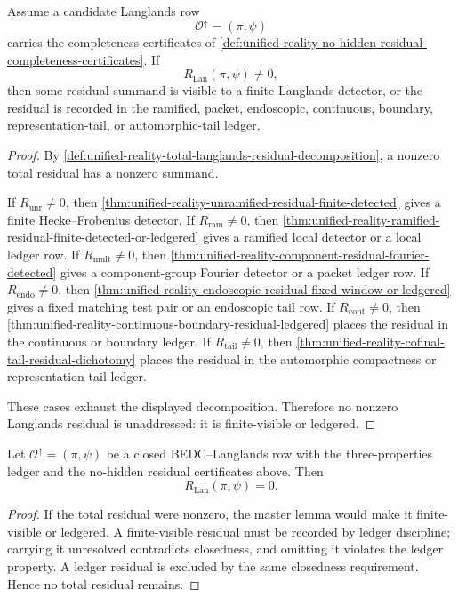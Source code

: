 \begin{theorem}
\label{thm:unified-reality-no-hidden-langlands-residual-master-lemma}
Assume a candidate Langlands row
$$
\mathcal O^\uparrow=(\pi,\psi)
$$
carries the completeness certificates of
\autoref{def:unified-reality-no-hidden-residual-completeness-certificates}.
If
$$
R_{\mathrm{Lan}}(\pi,\psi)\ne0,
$$
then some residual summand is visible to a finite Langlands detector, or
the residual is recorded in the ramified, packet, endoscopic,
continuous, boundary, representation-tail, or automorphic-tail ledger.
\end{theorem}
\begin{proof}
By
\autoref{def:unified-reality-total-langlands-residual-decomposition},
a nonzero total residual has a nonzero summand.

If $R_{\mathrm{unr}}\ne0$, then
\autoref{thm:unified-reality-unramified-residual-finite-detected}
gives a finite Hecke--Frobenius detector. If
$R_{\mathrm{ram}}\ne0$, then
\autoref{thm:unified-reality-ramified-residual-finite-detected-or-ledgered}
gives a ramified local detector or a local ledger row. If
$R_{\mathrm{mult}}\ne0$, then
\autoref{thm:unified-reality-component-residual-fourier-detected}
gives a component-group Fourier detector or a packet ledger row. If
$R_{\mathrm{endo}}\ne0$, then
\autoref{thm:unified-reality-endoscopic-residual-fixed-window-or-ledgered}
gives a fixed matching test pair or an endoscopic tail row. If
$R_{\mathrm{cont}}\ne0$, then
\autoref{thm:unified-reality-continuous-boundary-residual-ledgered}
places the residual in the continuous or boundary ledger. If
$R_{\mathrm{tail}}\ne0$, then
\autoref{thm:unified-reality-cofinal-tail-residual-dichotomy}
places the residual in the automorphic compactness or representation
tail ledger.

These cases exhaust the displayed decomposition. Therefore no nonzero
Langlands residual is unaddressed: it is finite-visible or ledgered.
\end{proof}

\begin{corollary}
\label{cor:unified-reality-closed-langlands-rows-zero-total-residual}
Let $\mathcal O^\uparrow=(\pi,\psi)$ be a closed BEDC--Langlands row
with the three-properties ledger and the no-hidden residual
certificates above. Then
$$
R_{\mathrm{Lan}}(\pi,\psi)=0.
$$
\end{corollary}
\begin{proof}
If the total residual were nonzero, the master lemma would make it
finite-visible or ledgered. A finite-visible residual must be recorded
by ledger discipline; carrying it unresolved contradicts closedness,
and omitting it violates the ledger property. A ledger residual is
excluded by the same closedness requirement. Hence no total residual
remains.
\end{proof}

